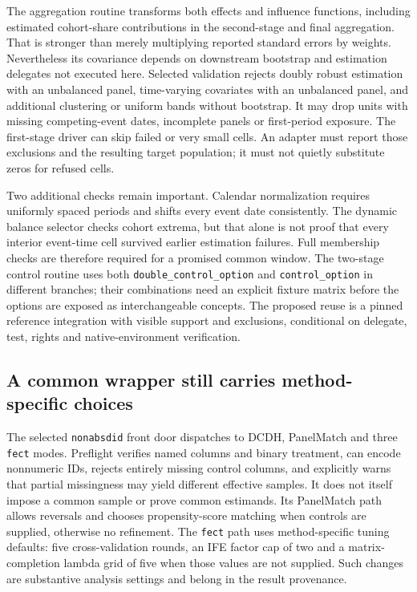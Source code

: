 The aggregation routine transforms both effects and influence functions, including estimated cohort-share contributions
in the second-stage and final aggregation. That is stronger than merely multiplying reported standard errors by weights.
Nevertheless its covariance depends on downstream bootstrap and estimation delegates not executed here. Selected validation
rejects doubly robust estimation with an unbalanced panel, time-varying covariates with an unbalanced panel, and additional
clustering or uniform bands without bootstrap. It may drop units with missing competing-event dates, incomplete panels or
first-period exposure. The first-stage driver can skip failed or very small cells. An adapter must report those exclusions
and the resulting target population; it must not quietly substitute zeros for refused cells.~\citep{exec28_panel_delegates}

Two additional checks remain important. Calendar normalization requires uniformly spaced periods and shifts every event
date consistently. The dynamic balance selector checks cohort extrema, but that alone is not proof that every interior
event-time cell survived earlier estimation failures. Full membership checks are therefore required for a promised common
window. The two-stage control routine uses both \texttt{double\_control\_option} and \texttt{control\_option} in different
branches; their combinations need an explicit fixture matrix before the options are exposed as interchangeable concepts.
The proposed reuse is a pinned reference integration with visible support and exclusions, conditional on delegate, test,
rights and native-environment verification.~\citep{exec28_panel_delegates}

\subsection{A common wrapper still carries method-specific choices}

The selected \texttt{nonabsdid} front door dispatches to DCDH, PanelMatch and three \texttt{fect} modes. Preflight verifies
named columns and binary treatment, can encode nonnumeric IDs, rejects entirely missing control columns, and explicitly
warns that partial missingness may yield different effective samples. It does not itself impose a common sample or prove
common estimands. Its PanelMatch path allows reversals and chooses propensity-score matching when controls are supplied,
otherwise no refinement. The \texttt{fect} path uses method-specific tuning defaults: five cross-validation rounds,
an IFE factor cap of two and a matrix-completion lambda grid of five when those values are not supplied. Such changes are
substantive analysis settings and belong in the result provenance.~\citep{exec28_panel_delegates}

